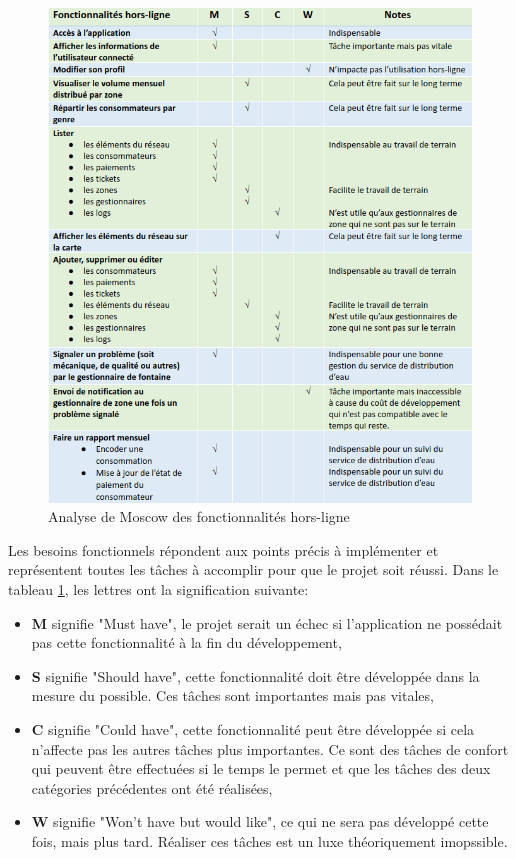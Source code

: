 \documentclass{EPL-master-thesis-covers-FR}
\begin{document}
			\begin{figure}[H]
				\centering
				\includegraphics[width=1\textwidth]{images/moscow}
				\caption{Analyse de Moscow des fonctionnalités hors-ligne}
				\label{fig:moscow}
			\end{figure}
			
			Les besoins fonctionnels répondent aux points précis à implémenter et représentent toutes les tâches à accomplir pour que le projet soit réussi. Dans le tableau \ref{fig:moscow}, les lettres ont la signification suivante: 
			\begin{itemize}
				\item \textbf{M} signifie "Must have", le projet serait un échec si l'application ne possédait pas cette fonctionnalité à la fin du développement,
				\item \textbf{S} signifie "Should have", cette fonctionnalité doit être développée dans la mesure du possible. Ces tâches sont importantes mais pas vitales,
				\item \textbf{C} signifie "Could have", cette fonctionnalité peut être développée si cela n'affecte pas les autres tâches plus importantes. Ce sont des tâches de confort qui peuvent être effectuées si le temps le permet et que les tâches des deux catégories précédentes ont été réalisées,
				\item \textbf{W} signifie "Won't have but would like", ce qui ne sera pas développé cette fois, mais plus tard. Réaliser ces tâches est un luxe théoriquement imopssible.
			\end{itemize}
\end{document}
